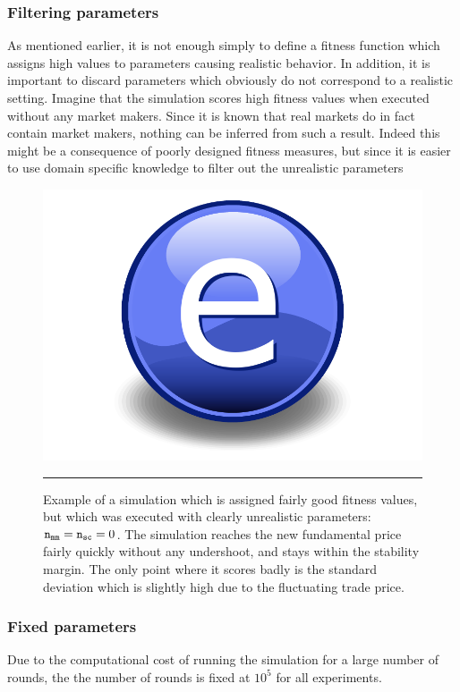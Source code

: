 \subsubsection{Filtering parameters}\label{section:filtering_parameters}
As mentioned earlier, it is not enough simply to define a fitness function which assigns high values to parameters causing realistic behavior. In addition, it is important to discard parameters which obviously do not correspond to a realistic setting. Imagine that the simulation scores high fitness values when executed without any market makers. Since it is known that real markets do in fact contain market makers, nothing can be inferred from such a result. Indeed this might be a consequence of poorly designed fitness measures, but since it is easier to use domain specific knowledge to filter out the unrealistic parameters

\begin{figure}[htbp]
	\centering
		\includegraphics{Figures/Electron.pdf}
		\rule{35em}{0.5pt}
	\caption{Example of a simulation which is assigned fairly good fitness values, but which was executed with clearly unrealistic parameters: $ \texttt{n}_\texttt{mm}  =  \texttt{n}_\texttt{sc}  = 0$. The simulation reaches the new fundamental price fairly quickly without any undershoot, and stays within the stability margin. The only point where it scores badly is the standard deviation which is slightly high due to the fluctuating trade price.}
	\label{fig:no_marketmakers}
\end{figure}



\subsubsection{Fixed parameters}
Due to the computational cost of running the simulation for a large number of rounds, the the number of rounds is fixed at $10^5$ for all experiments.




